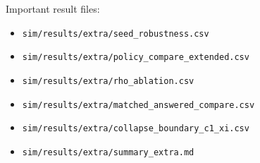 \documentclass{article}
\begin{document}
Important result files:
\begin{itemize}[leftmargin=1.5em]
\item \texttt{sim/results/extra/seed\_robustness.csv}
\item \texttt{sim/results/extra/policy\_compare\_extended.csv}
\item \texttt{sim/results/extra/rho\_ablation.csv}
\item \texttt{sim/results/extra/matched\_answered\_compare.csv}
\item \texttt{sim/results/extra/collapse\_boundary\_c1\_xi.csv}
\item \texttt{sim/results/extra/summary\_extra.md}
\end{itemize}



\end{document}
